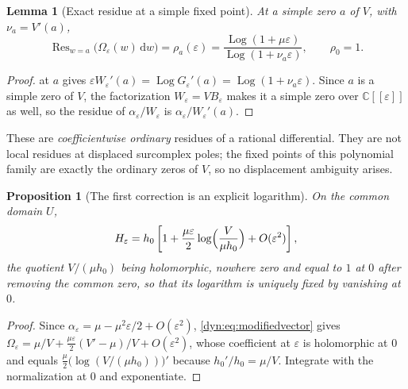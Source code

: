 \documentclass[11pt,letterpaper]{article}
\newtheorem{lemma}[lemma]{Lemma}
\newtheorem{proposition}[proposition]{Proposition}
\theoremstyle{definition}
\theoremstyle{remark}
\newcommand{\C}{\mathbb C}
\newcommand{\Res}{\operatorname{Res}}
\newcommand{\Log}{\operatorname{Log}}
\newcommand{\eps}{\varepsilon}
\newcommand{\dd}{\,\mathrm d}
\numberwithin{equation}{section}
\begin{document}
\begin{lemma}[Exact residue at a simple fixed point]\label{dyn:lem:residue}
At a simple zero $a$ of $V$, with $\nu_a=V'(a)$,
\begin{equation}\label{dyn:eq:exactresidue}
 \Res_{w=a}\bigl(\Omega_\eps(w)\dd w\bigr)=\rho_a(\eps)
 =\frac{\Log(1+\mu\eps)}{\Log(1+\nu_a\eps)},\qquad \rho_0=1 .
\end{equation}
\end{lemma}
\begin{proof}
 at $a$ gives
$\eps W_\eps'(a)=\Log G_\eps'(a)=\Log(1+\nu_a\eps)$. Since $a$ is a simple
zero of $V$, the factorization $W_\eps=VB_\eps$ makes it a simple zero over
$\C[[\eps]]$ as well, so the residue of $\alpha_\eps/W_\eps$ is
$\alpha_\eps/W_\eps'(a)$.
\end{proof}

These are \emph{coefficientwise ordinary} residues of a rational
differential. They are not local residues at displaced surcomplex poles;
the fixed points of this polynomial family are exactly the ordinary zeros
of $V$, so no displacement ambiguity arises.

\begin{proposition}[The first correction is an explicit logarithm]
\label{dyn:prop:firstcorrection}
On the common domain $U$,
\begin{equation}\label{dyn:eq:firstcorrection}
 H_\eps=h_0\left[1+\frac{\mu\eps}{2}
 \log\Bigl(\frac{V}{\mu h_0}\Bigr)+O(\eps^{2})\right],
\end{equation}
the quotient $V/(\mu h_0)$ being holomorphic, nowhere zero and equal to $1$
at $0$ after removing the common zero, so that its logarithm is uniquely
fixed by vanishing at $0$.
\end{proposition}
\begin{proof}
Since $\alpha_\eps=\mu-\mu^{2}\eps/2+O(\eps^{2})$,
\eqref{dyn:eq:modifiedvector} gives
$\Omega_\eps=\mu/V+\frac{\mu\eps}2(V'-\mu)/V+O(\eps^{2})$, whose
coefficient at $\eps$ is holomorphic at $0$ and equals
$\frac\mu2\bigl(\log(V/(\mu h_0))\bigr)'$ because $h_0'/h_0=\mu/V$.
Integrate with the normalization at $0$ and exponentiate.
\end{proof}
\end{document}
